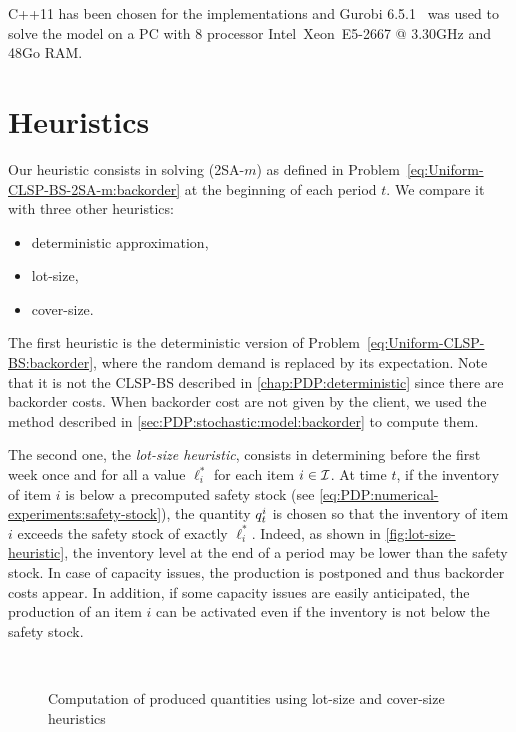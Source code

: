 C++11 has been chosen for the implementations and Gurobi 6.5.1~\citet{gurobi} was used to solve the model on a PC with 8 processor Intel\textregistered\ Xeon\texttrademark\ E5-2667 @ 3.30GHz and 48Go RAM.




\section{Heuristics}
\label{sec:PDP:numerical-experiments:heuristics}


Our heuristic consists in solving (2SA-$m$) as defined in Problem~\eqref{eq:Uniform-CLSP-BS-2SA-m:backorder} at the beginning of each period $t$.
We compare it with three other heuristics:
\begin{itemize}
  \item deterministic approximation,
  \item lot-size,
  \item cover-size.
\end{itemize}


The first heuristic is the deterministic version of Problem~\eqref{eq:Uniform-CLSP-BS:backorder}, where the random demand is replaced by its expectation.
Note that it is not the CLSP-BS described in \cref{chap:PDP:deterministic} since there are backorder costs.
When backorder cost are not given by the client, we used the method described in \cref{sec:PDP:stochastic:model:backorder} to compute them.


The second one, the {\em lot-size heuristic}, consists in determining before the first week once and for all a value $\ell_i^*$ for each item $i\in\mathcal{I}$.
At time $t$, if the inventory of item $i$ is below a precomputed safety stock (see \cref{eq:PDP:numerical-experiments:safety-stock}), the quantity $q_t^i$ is chosen so that the inventory of item $i$ exceeds the safety stock of exactly $\ell_i^*$.
Indeed, as shown in \cref{fig:lot-size-heuristic}, the inventory level at the end of a period may be lower than the safety stock.
In case of capacity issues, the production is postponed and thus backorder costs appear.
In addition, if some capacity issues are easily anticipated, the production of an item $i$ can be activated even if the inventory is not below the safety stock.

\begin{figure}[h]
  \centering
  \\
  \caption{Computation of produced quantities using lot-size and cover-size heuristics}
  \label{fig:lot-and-cover-size-heuristics}
\end{figure}


